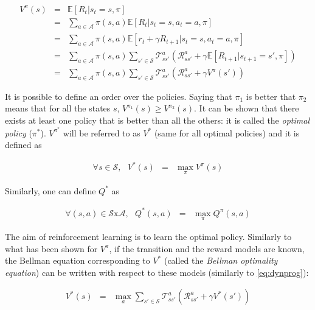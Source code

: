 			\begin{eqnarray}
					V^{\pi} (s)   & = & \mathbb{E} [R_t | s_t = s, \pi] \nonumber \\
					& = & \sum_{a \in \mathcal{A}} \pi (s,a) \mathbb{E} [R_t | s_t = s, a_t = a, \pi] \nonumber \\
					& = & \sum_{a \in \mathcal{A}} \pi (s,a) \mathbb{E} [r_t + \gamma R_{t+1} | s_t = s, a_t = a, \pi] \nonumber \\
					& = & \sum_{a \in \mathcal{A}} \pi (s,a)  \sum_{s' \in \mathcal{S}} \mathscr{T}_{ss'}^a (\mathscr{R}_{ss'}^a + \gamma \mathbb{E} [R_{t+1} | s_{t+1} = s', \pi]) \nonumber \\
					& = & \sum_{a \in \mathcal{A}} \pi (s,a)  \sum_{s' \in \mathcal{S}} \mathscr{T}_{ss'}^a (\mathscr{R}_{ss'}^a + \gamma V^{\pi} (s')) \label{eq:dynprog}
			\end{eqnarray}
					
			It is possible to define an order over the policies. Saying that $\pi_1$ is better that $\pi_2$ means that for all the states $s$, $V^{\pi_1} (s) \geq V^{\pi_2} (s)$. It can be shown that there exists at least one policy that is better than all the others: it is called the \textit{optimal policy} ($\pi^*$). $V^{\pi^*}$ will be referred to as $V^*$ (same for all optimal policies) and it is defined as
				
				\begin{eqnarray}
					\forall s \in \mathcal{S}, \text{ } V^* (s) & = & \max_\pi V^\pi (s) \label{eq:voptim}
				\end{eqnarray}
					
			Similarly, one can define $Q^*$ as
				
				\begin{eqnarray}
					\forall (s,a) \in \mathcal{S} \text{x} \mathcal{A}, \text{ } Q^*(s,a) & = & \max_\pi Q^{\pi}(s,a) \label{eq:qoptim}
				\end{eqnarray}

			The aim of reinforcement learning is to learn the optimal policy. Similarly to what has been shown for $V^{\pi}$, if the transition and the reward models are known, the Bellman equation corresponding to $V^*$ (called the \textit{Bellman optimality equation}) can be written with respect to these models (similarly to \ref{eq:dynprog}):
							
				\begin{eqnarray}
					V^*(s) & = & \max_a \sum_{s' \in \mathcal{S}} \mathscr{T}_{ss'}^a (\mathscr{R}_{ss'}^a + \gamma V^*(s')) \label{eq:vbellmanoptim}
				\end{eqnarray}
			

